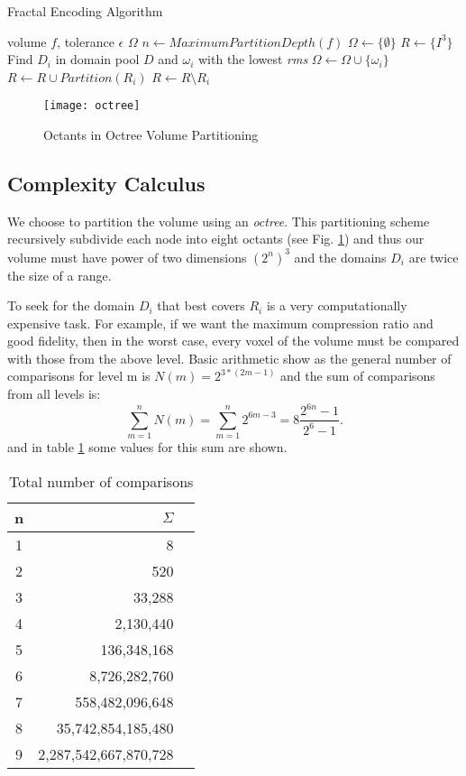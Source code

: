 \documentclass[10pt, conference, compsocconf]{IEEEtran}
\begin{document}
\begin{algorithm}
\caption{Fractal Encoding Algorithm}
\label{encoding}
\begin{algorithmic}
\REQUIRE volume $f$, tolerance $\epsilon$
\ENSURE $\Omega$
\STATE $n \leftarrow MaximumPartitionDepth( f )$
\STATE $\Omega \leftarrow \{ \emptyset \}$
\STATE $R \leftarrow \{I^3\}$
\STATE Find $D_i$ in domain pool $D$ and $\omega_i$ with the lowest \emph{rms}
\STATE $\Omega \leftarrow \Omega \cup \{\omega_i\}$
\ELSE
\STATE $R \leftarrow R \cup Partition( R_i ) $
\ENDIF
\STATE $R \leftarrow R \setminus R_i$
\ENDFOR
\end{algorithmic}
\end{algorithm}

\begin{figure}[!t]
\centering
\texttt{[image: octree]}
\caption{Octants in Octree Volume Partitioning}
\label{fig:octree}
\end{figure}

\subsection{Complexity Calculus}
We choose to partition the volume using an \emph{octree}. This partitioning scheme recursively subdivide each node into eight octants (see Fig. \ref{fig:octree}) and thus our volume must have power of two dimensions $(2^n)^3$ and the domains $D_i$ are twice the size of a range.

To seek for the domain $D_i$ that best covers $R_i$ is a very computationally expensive task. For example, if we want the maximum compression ratio and good fidelity, then in the worst case, every voxel of the volume must be compared with those from the above level. Basic arithmetic show as the general number of comparisons for level m is $N(m) = 2^{3*(2m-1)}$ and the sum of comparisons from all levels is:
\begin{equation}\label{eq:comparisons}
\displaystyle \sum_{m=1}^n N(m) = \sum_{m=1}^n 2^{6m-3}=8\frac{2^{6n}-1}{2^6-1}.
\end{equation}
and in table \ref{table:comparisons} some values for this sum are shown.
\begin{table}[!t]
\centering
\renewcommand{\tablename}{TABLE}
\caption{Total number of comparisons}
\begin{tabular}{c rc}
\hline\hline
n & $\Sigma$ \\ [0.5ex]
\hline
1 & 8 \\
2 & 520 \\
3 & 33,288 \\
4 & 2,130,440\\
5 & 136,348,168\\
6 & 8,726,282,760\\
7 & 558,482,096,648\\
8 & 35,742,854,185,480\\
9 & 2,287,542,667,870,728\\
\hline
\end{tabular}
\label{table:comparisons}
\end{table}
\end{document}
